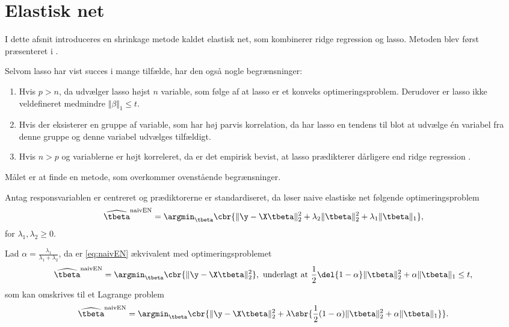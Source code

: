 \section{Elastisk net}
I dette afsnit introduceres en shrinkage metode kaldet elastisk net, som kombinerer ridge regression og lasso.
Metoden blev først præsenteret i \citep{zou_hastie}.

Selvom lasso har vist succes i mange tilfælde, har den også nogle begrænsninger:
%
\begin{enumerate}[label=\textnormal{(\arabic*)}]
    \item Hvis $p>n$, da udvælger lasso højst $n$ variable, som følge af at lasso er et konveks optimeringsproblem. Derudover er lasso ikke veldefineret medmindre \(\Vert \beta \Vert_1 \leq t\). \label{itm:1}
    \item Hvis der eksisterer en gruppe af variable, som har høj parvis korrelation, da har lasso en tendens til blot at udvælge  én variabel fra denne gruppe og denne variabel udvælges tilfældigt. \label{itm:2}
    \item Hvis $n>p$ og variablerne er højt korreleret, da er det empirisk bevist, at lasso prædikterer dårligere end ridge regression \citep{lasso}.  \label{itm:3}
\end{enumerate}
%
Målet er at finde en metode, som overkommer ovenstående begrænsninger.
%
\begin{defn}
Antag responsvariablen er centreret og prædiktorerne er standardiseret, da løser naive elastiske net følgende optimeringsproblem
\begin{align}
\widehat{\tbeta}^\text{naivEN} = \argmin_{\tbeta} \cbr{\Vert \y - \X \tbeta \Vert_2^2 + \lambda_2 \Vert \tbeta \Vert_2^2 + \lambda_1 \Vert \tbeta \Vert_1}, \label{eq:naivEN}
\end{align}
for \(\lambda_1, \lambda_2 \geq 0\).
\end{defn}
%
Lad \(\alpha = \frac{\lambda_1}{\lambda_1 + \lambda_2}\), da er \eqref{eq:naivEN} ækvivalent med optimeringsproblemet
\begin{align*}
\widehat{\tbeta}^\text{naivEN} = \argmin_{\tbeta} \cbr{\Vert \y - \X \tbeta \Vert_2^2}, \ \text{underlagt at } \frac{1}{2}\del{1-\alpha} \Vert \tbeta \Vert_2^2 + \alpha \Vert \tbeta \Vert_1 \leq t,
\end{align*}
som kan omskrives til et Lagrange problem
\begin{align}
\widehat{\tbeta}^\text{naivEN} =\argmin_{\tbeta} \cbr{ \Vert \y - \X \tbeta \Vert_2^2 + \lambda \sbr{\frac{1}{2}(1- \alpha) \Vert \tbeta \Vert_2^2 + \alpha \Vert \tbeta \Vert_1}}. \label{eq:4.2}
\end{align}
